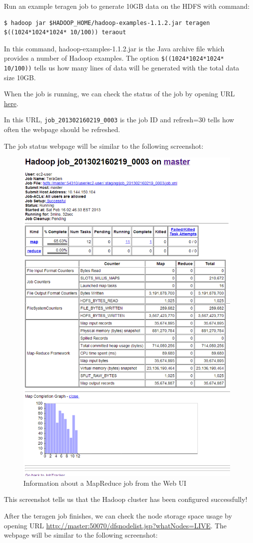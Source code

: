 Run an example teragen job to generate 10GB data on the HDFS with command:
\lstset{style=bashstyle}
\begin{lstlisting}
$ hadoop jar $HADOOP_HOME/hadoop-examples-1.1.2.jar teragen $((1024*1024*1024* 10/100)) teraout
\end{lstlisting}

In this command, hadoop-examples-1.1.2.jar is the Java archive file which provides a number of Hadoop examples. The option \verb|$((1024*1024*1024* 10/100))| tells us how many lines of data will be generated with the total data size 10GB.

When the job is running, we can check the status of the job by opening URL \href{http://master:50030/jobdetails.jsp?jobid=job_201302160219_0003&refresh=30}{here}.

In this URL, \verb|job_201302160219_0003| is the job ID and refresh=30 tells how often the webpage should be refreshed.

The job status webpage will be similar to the following screenshot: \\
\begin{figure}[h]
  \centering
  \includegraphics[width=.5\textwidth]{figs/5163os_03_06.png}
  \caption{Information about a MapReduce job from the Web UI}\label{fig:mapreduce.job}
\end{figure} 


This screenshot tells us that the Hadoop cluster has been configured successfully!

After the teragen job finishes, we can check the node storage space usage by opening URL \url{http://master:50070/dfsnodelist.jsp?whatNodes=LIVE}. The webpage will be similar to the following screenshot: \\

